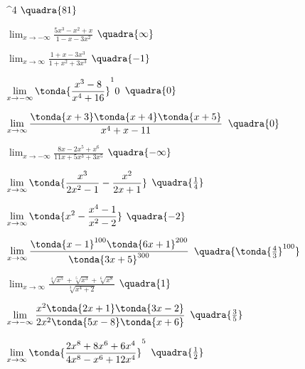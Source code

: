 \begin{esercizio}
\begin{multicols}{2}
\begin{enumeratea}
          ^4\)
  \hfill \(\quadra{81}\)
  \item \(\displaystyle \lim_{x \rightarrow -\infty} 
          \frac{5x^3-x^2+x}{1-x-3x^2}\)
  \hfill \(\quadra{\infty}\)
  \item \(\displaystyle \lim_{x \rightarrow \infty} 
          \frac{1+x-3x^3}{1+x^2+3x^3}\)
  \hfill \(\quadra{-1}\)
  \item \(\displaystyle \lim_{x \rightarrow -\infty} 
          \tonda{\frac{x^3-8}{x^4+16}}^10\)
  \hfill \(\quadra{0}\)
  \item \(\displaystyle \lim_{x \rightarrow \infty} 
          \frac{\tonda{x+3}\tonda{x+4}\tonda{x+5}}{x^4+x-11}\)
  \hfill \(\quadra{0}\)
  \item \(\displaystyle \lim_{x \rightarrow -\infty} 
          \frac{8x-2x^5+x^6}{11x+5x^3+3x^5}\)
  \hfill \(\quadra{-\infty}\)
  \item \(\displaystyle \lim_{x \rightarrow \infty} 
          \tonda{\frac{x^3}{2x^2-1}-\frac{x^2}{2x+1}}\)
  \hfill \(\quadra{\frac{1}{4}}\)
  \item \(\displaystyle \lim_{x \rightarrow \infty} 
          \tonda{x^2-\frac{x^4-1}{x^2-2}}\)
  \hfill \(\quadra{-2}\)
  \item \(\displaystyle \lim_{x \rightarrow \infty} 
          \frac{\tonda{x-1}^{100}\tonda{6x+1}^{200}}{\tonda{3x+5}^{300}}\)
  \hfill \(\quadra{\tonda{\frac{4}{3}}^{100}}\)
  \item \(\displaystyle \lim_{x \rightarrow \infty} 
          \frac{\sqrt[4]{x^5}+\sqrt[5]{x^3}+\sqrt[6]{x^8}}
               {\sqrt[3]{x^4+2}}\)
  \hfill \(\quadra{1}\)
  \item \(\displaystyle \lim_{x \rightarrow -\infty} 
          \frac{x^2\tonda{2x+1}\tonda{3x-2}}
               {2x^2\tonda{5x-8}\tonda{x+6}}\)
  \hfill \(\quadra{\frac{3}{5}}\)
  \item \(\displaystyle \lim_{x \rightarrow \infty} 
          \tonda{\frac{2x^8+8x^6+6x^4}{4x^8-x^6+12x^4}}^5\)
  \hfill \(\quadra{\frac{1}{2}}\)
 \end{enumeratea}
 \end{multicols}
\end{esercizio}

